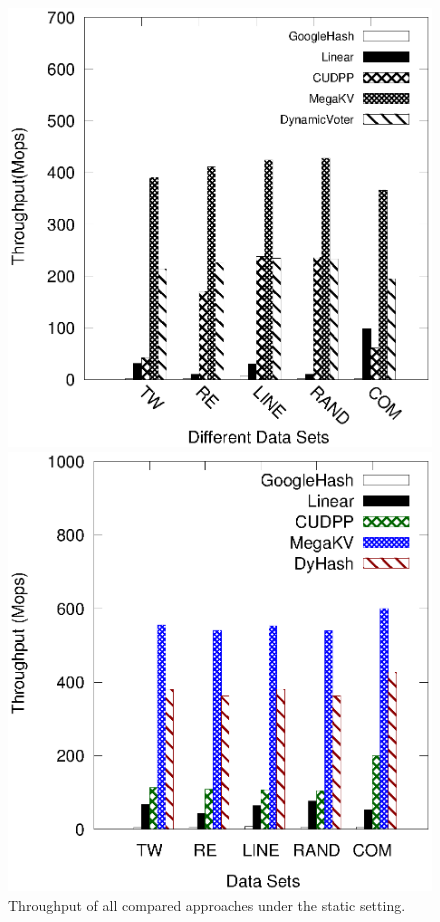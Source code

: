 \begin{figure}[t!]
	\begin{minipage}{0.48\linewidth}\centering
		\includegraphics[width=\linewidth]{pic/static/static_insert.eps}
		\centerline{}
	\end{minipage}
	\hfill
	\begin{minipage}{0.48\linewidth}\centering
		\includegraphics[width=\linewidth]{pic/static/static_search.eps}
		\centerline{}
	\end{minipage}
	\caption{Throughput of all compared approaches under the static setting.}
	\label{fig:static}
\end{figure}

